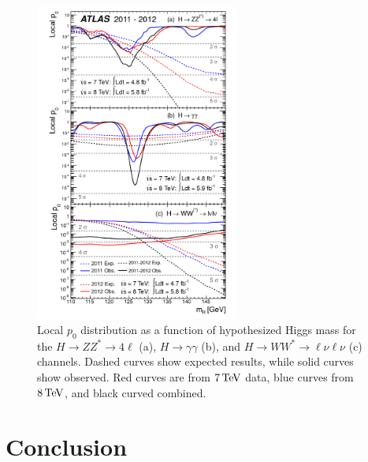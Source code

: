 \begin{figure}[h!]
  \centering
  \captionsetup{justification=centering}
  \includegraphics[width=0.6\textwidth]{figures/discovery_p0_comp}
  \caption{Local $p_0$ distribution as a function of hypothesized Higgs mass for the $H\to ZZ^* \to 4\ell$ (a), $H\to\gamma\gamma$ (b), and $H\to WW^*\to \ell\nu\ell\nu$ (c) channels. Dashed curves show expected results, while solid curves show observed. Red curves are from $7 \TeV$ data, blue curves from $8\TeV$, and black curved combined\cite{Discovery}.}
  \label{fig:disc_p0_comp}
\end{figure}

\section{Conclusion}

